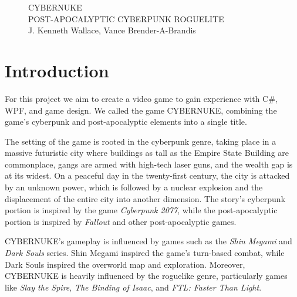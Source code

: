 \documentclass[10pt,conference,onecolumn,compsoc]{IEEEtran}
\begin{document}

\begin{figure}
\centering
{\Huge CYBERNUKE}\\
POST-APOCALYPTIC CYBERPUNK ROGUELITE\\
J. Kenneth Wallace, Vance Brender-A-Brandis\\
\end{figure}
\IEEEdisplaynontitleabstractindextext
\IEEEpeerreviewmaketitle



\section{Introduction}

For this project we aim to create a video game to gain experience with C\#, WPF, and game design. We called the game CYBERNUKE, combining the game's cyberpunk and post-apocalyptic elements into a single title.

The setting of the game is rooted in the cyberpunk genre, taking place in a massive futuristic city where buildings as tall as the Empire State Building are commonplace, gangs are armed with high-tech laser guns, and the wealth gap is at its widest. On a peaceful day in the twenty-first century, the city is attacked by an unknown power, which is followed by a nuclear explosion and the displacement of the entire city into another dimension. The story's cyberpunk portion is inspired by the game \emph{Cyberpunk 2077}, while the post-apocalyptic portion is inspired by \emph{Fallout} and other post-apocalyptic games. 

CYBERNUKE's gameplay is influenced by games such as the \emph{Shin Megami} and \emph{Dark Souls} series. Shin Megami inspired the game's turn-based combat, while Dark Souls inspired the overworld map and exploration. Moreover, CYBERNUKE is heavily influenced by the roguelike genre, particularly games like \emph{Slay the Spire}, \emph{The Binding of Isaac}, and \emph{FTL: Faster Than Light}.
\end{document}
